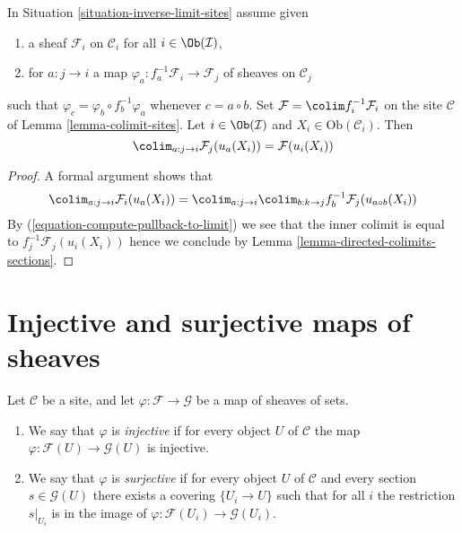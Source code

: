 \begin{lemma}
\label{lemma-colimit}
In Situation \ref{situation-inverse-limit-sites} assume given
\begin{enumerate}
\item a sheaf $\mathcal{F}_i$ on $\mathcal{C}_i$ for all
$i \in \Ob(\mathcal{I})$,
\item for $a : j \to i$ a map
$\varphi_a : f_a^{-1}\mathcal{F}_i \to \mathcal{F}_j$
of sheaves on $\mathcal{C}_j$
\end{enumerate}
such that $\varphi_c = \varphi_b \circ f_b^{-1}\varphi_a$
whenever $c = a \circ b$. Set $\mathcal{F} = \colim f_i^{-1}\mathcal{F}_i$
on the site $\mathcal{C}$ of Lemma \ref{lemma-colimit-sites}.
Let $i \in \Ob(\mathcal{I})$ and $X_i \in \text{Ob}(\mathcal{C}_i)$. Then
$$
\colim_{a : j \to i} \mathcal{F}_j(u_a(X_i)) = \mathcal{F}(u_i(X_i))
$$
\end{lemma}

\begin{proof}
A formal argument shows that
$$
\colim_{a : j \to i} \mathcal{F}_i(u_a(X_i)) =
\colim_{a : j \to i} \colim_{b : k \to j}
f_b^{-1}\mathcal{F}_j(u_{a \circ b}(X_i))
$$
By (\ref{equation-compute-pullback-to-limit})
we see that the inner colimit is equal to
$f_j^{-1}\mathcal{F}_j(u_i(X_i))$ hence we conclude by
Lemma \ref{lemma-directed-colimits-sections}.
\end{proof}












\section{Injective and surjective maps of sheaves}
\label{section-sheaves-injective}

\begin{definition}
\label{definition-sheaves-injective-surjective}
Let $\mathcal{C}$ be a site, and let $\varphi : \mathcal{F}
\to \mathcal{G}$ be a map of sheaves of sets.
\begin{enumerate}
\item We say that $\varphi$ is {\it injective} if for every object
$U$ of $\mathcal{C}$ the map $\varphi : \mathcal{F}(U)
\to \mathcal{G}(U)$ is injective.
\item We say that $\varphi$ is {\it surjective} if for every object
$U$ of $\mathcal{C}$ and every section $s\in \mathcal{G}(U)$
there exists a covering $\{U_i \to U\}$ such that for
all $i$ the restriction $s|_{U_i}$ is in the image of
$\varphi : \mathcal{F}(U_i) \to \mathcal{G}(U_i)$.
\end{enumerate}
\end{definition}

